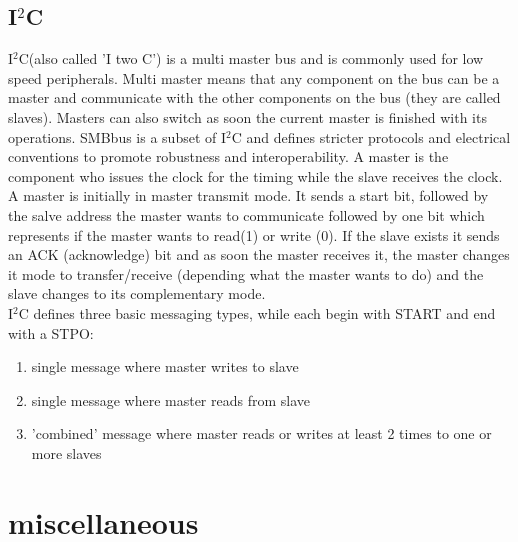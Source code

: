 \documentclass[a4paper]{scrartcl}
\begin{document}
        \subsection{I\(^2\)C}     
            I\(^2\)C(also called 'I two C') is a multi master bus and is commonly used for low speed peripherals. Multi master means that any component on the bus can be a
            master and communicate with the other components on the bus (they are called slaves). Masters can also switch as soon the current master is finished with its
            operations. SMBbus is a subset of I\(^2\)C and defines stricter protocols and electrical conventions to promote robustness and interoperability. A master is 
            the component who issues the clock for the timing while the slave receives the clock. \\
            A master is initially in master transmit mode. It sends a start bit, followed by the salve address the master wants to communicate followed by one bit which 
            represents if the master wants to read(1) or write (0). If the slave exists it sends an ACK (acknowledge) bit and as soon the master receives it, the master changes
            it mode to transfer/receive (depending what the master wants to do) and the slave changes to its complementary mode. \\
            I\(^2\)C defines three basic messaging types, while each begin with START and end with a STPO:
            \begin{enumerate}
                \item single message where master writes to slave
                \item single message where master reads from slave
                \item 'combined' message where master reads or writes at least 2 times to one or more slaves
            \end{enumerate}
    
    
    
    
    
    
    
    
    \section{miscellaneous}
\end{document}
